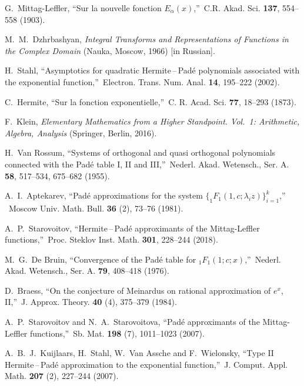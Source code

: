 \documentclass[
11pt,%
tightenlines,%
twoside,%
onecolumn,%
nofloats,%
nobibnotes,%
nofootinbib,%
superscriptaddress,%
noshowpacs,%
centertags]%
{revtex4}
\begin{document}
\begin{thebibliography}{99}
G.~Mittag-Leffler, \textquotedblleft Sur la nouvelle
fonction $E_\alpha(x)$,\textquotedblright~C.R. Akad.
Sci. \textbf{137}, 554--558 (1903).

M.~M.~Dzhrbashyan, \emph{Integral Transforms and
Representations of Functions in the Complex Domain}
(Nauka, Moscow, 1966) [in Russian].

H.~Stahl, \textquotedblleft Asymptotics for quadratic
Hermite\,--\,Pad\'e polynomials associated with the exponential
function,\textquotedblright~Electron. Trans. Num. Anal.
\textbf{14}, 195--222 (2002).

C.~Hermite, \textquotedblleft Sur la fonction exponentielle,\textquotedblright~C. R. Acad. Sci. \textbf{77}, 18--293 (1873).

F.~Klein, \emph{Elementary Mathematics from a Higher Standpoint.
	Vol.~1: Arithmetic, Algebra, Analysis} (Springer, Berlin, 2016).

H.~Van Rossum, \textquotedblleft Systems of orthogonal and quasi
orthogonal polynomials connected with the Pad\'e table I, II and
III,\textquotedblright~Nederl. Akad. Wetensch., Ser. A. \textbf{58},
517--534, 675--682 (1955).

A.~I.~Aptekarev, \textquotedblleft Pad\'e approximations for the
system $\{_1F_1(1, c; \lambda_i z)\}^k_{i=1}$,\textquotedblright
~Moscow Univ. Math. Bull. \textbf{36} (2), 73--76 (1981).

A.~P.~Starovoitov, \textquotedblleft Hermite\,--\,Pad\'e approximants
of the Mittag-Leffler functions,\textquotedblright~Proc. Steklov Inst.
Math. \textbf{301}, 228--244 (2018).

M.~G.~De Bruin, \textquotedblleft Convergence of the Pad\'e table for
$_1F_1(1;c;x)$,\textquotedblright~Nederl. Akad. Wetensch., Ser. A.
\textbf{79}, 408--418 (1976).

D.~Braess, \textquotedblleft On the conjecture of Meinardus on rational
approximation of  $e^x$, II,\textquotedblright~J. Approx. Theory.
\textbf{40} (4), 375--379 (1984).

A.~P.~Starovoitov and N.~A.~Starovoitova, \textquotedblleft Pad\'e
approximants of the Mittag-Leffler functions,\textquotedblright~Sb.
Mat. \textbf{198} (7), 1011--1023 (2007).

A.~B.~J.~Kuijlaars, H.~Stahl, W.~Van Assche and F.~Wielonsky,
\textquotedblleft Type II Hermite\,--\,Pad\'e approximation to the exponential
function,\textquotedblright~J. Comput. Appl. Math. \textbf{207} (2), 227--244
(2007).


\end{thebibliography}
\end{document}
